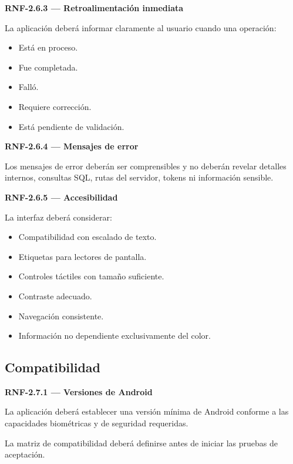 \documentclass[12pt,a4paper]{article}
\newcommand{\RNF}[1]{\textbf{\color{secondary}RNF-#1}}
\newenvironment{requisito}[1]
{
\begin{center}
\begin{minipage}{0.96\textwidth}
\colorbox{requirement}{
\begin{minipage}{0.94\textwidth}
\textbf{#1}
\end{minipage}
}
\vspace{2mm}
}
{
\end{minipage}
\end{center}
}
\begin{document}
\begin{requisito}{\RNF{2.6.3} --- Retroalimentación inmediata}
La aplicación deberá informar claramente al usuario cuando una operación:

\begin{itemize}[leftmargin=*]
\item Está en proceso.
\item Fue completada.
\item Falló.
\item Requiere corrección.
\item Está pendiente de validación.
\end{itemize}
\end{requisito}

\begin{requisito}{\RNF{2.6.4} --- Mensajes de error}
Los mensajes de error deberán ser comprensibles y no deberán revelar detalles
internos, consultas SQL, rutas del servidor, tokens ni información sensible.
\end{requisito}

\begin{requisito}{\RNF{2.6.5} --- Accesibilidad}
La interfaz deberá considerar:

\begin{itemize}[leftmargin=*]
\item Compatibilidad con escalado de texto.
\item Etiquetas para lectores de pantalla.
\item Controles táctiles con tamaño suficiente.
\item Contraste adecuado.
\item Navegación consistente.
\item Información no dependiente exclusivamente del color.
\end{itemize}
\end{requisito}

\subsection{Compatibilidad}

\begin{requisito}{\RNF{2.7.1} --- Versiones de Android}
La aplicación deberá establecer una versión mínima de Android conforme a las
capacidades biométricas y de seguridad requeridas.

La matriz de compatibilidad deberá definirse antes de iniciar las pruebas de
aceptación.
\end{requisito}
\end{document}
